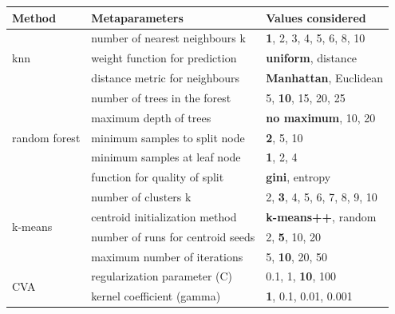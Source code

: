 \documentclass[12pt]{article}
\begin{document}
\begin{table} %
  \small
  \begin{center}
  \vspace{-1.5\baselineskip} %
  \setlength{\abovecaptionskip}{5pt}
  \setlength{\belowcaptionskip}{5pt}
  \fontsize{10}{10}\selectfont %
  \begin{tabular}{l|l|l}
  Method & Metaparameters & Values considered\\
  \hline
  \multirow{3}{*}{knn} & number of nearest neighbours k	  & {\normalsize\textbf{1}}, 2, 3, 4, 5, 6, 8, 10 \\
                        & weight function for prediction	& {\normalsize\textbf{uniform}}, distance \\
                        & distance metric for neighbours	& {\normalsize\textbf{Manhattan}}, Euclidean \\
  \hline
  \multirow{5}{*}{random forest} & number of trees in the forest	 & 5, {\normalsize\textbf{10}}, 15, 20, 25 \\
                                  & maximum depth of trees	       & {\normalsize\textbf{no maximum}}, 10, 20 \\
                                  & minimum samples to split node	 & {\normalsize\textbf{2}}, 5, 10 \\
                                  & minimum samples at leaf node   & {\normalsize\textbf{1}}, 2, 4 \\
                                  & function for quality of split  & {\normalsize\textbf{gini}}, entropy \\
  \hline
  \multirow{4}{*}{k-means} & number of clusters k                & 2, {\normalsize\textbf{3}}, 4, 5, 6, 7, 8, 9, 10 \\
                            & centroid initialization method     & {\normalsize\textbf{k-means++}}, random \\
                            & number of runs for centroid seeds	 & 2, {\normalsize\textbf{5}}, 10, 20 \\
                            & maximum number of iterations       & 5, {\normalsize\textbf{10}}, 20, 50 \\
  \hline
  \multirow{3}{*}{CVA} & regularization parameter (C)  & 0.1, 1, {\normalsize\textbf{10}}, 100 \\
                        & kernel coefficient (gamma)   & {\normalsize\textbf{1}}, 0.1, 0.01, 0.001 \\

\end{tabular}
\end{center}
\end{table}
\end{document}

